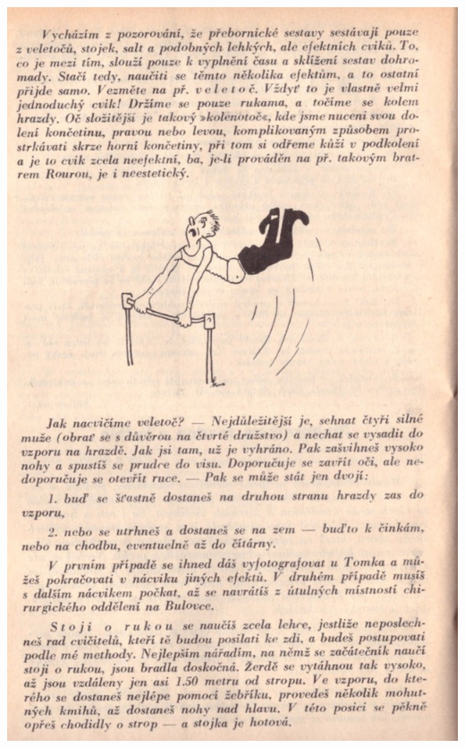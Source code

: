 \documentclass[11pt]{article}
\begin{document}
\includegraphics[width=\imagewidth]{original/1934/Skener_20250325 (9).jpg}
\end{document}
